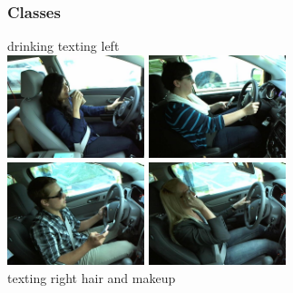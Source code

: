 \documentclass{beamer}
\begin{document}
    \begin{frame}
		\frametitle{Classes}
			\begin{center}
                \quad drinking \quad \quad \quad \quad \quad \quad  texting left\\
				\includegraphics[width=4cm]{img_0} \vspace{0.1cm}
				\includegraphics[width=4cm]{img_5} \\
				\includegraphics[width=4cm]{img_6}\vspace{0.1cm}
				\includegraphics[width=4cm]{img_26}\\
                \quad texting right \quad \quad \quad \quad hair and makeup
			\end{center}
	\end{frame}
	
\end{document}
